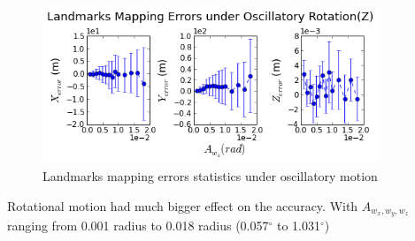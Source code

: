 \begin{figure}[h]
  \includegraphics[width=10cm, keepaspectratio=true]{./Figures/SimulationFigures/Figure24.png}
  \caption{Landmarks mapping errors statistics under oscillatory motion}
  \label{fig:simfig20-24}
\end{figure}

Rotational motion had much bigger effect on the accuracy. With
$A_{w_x, w_y, w_z}$ ranging from 0.001 radius to 0.018
radius (0.057$^\circ$ to 1.031$^\circ$)

